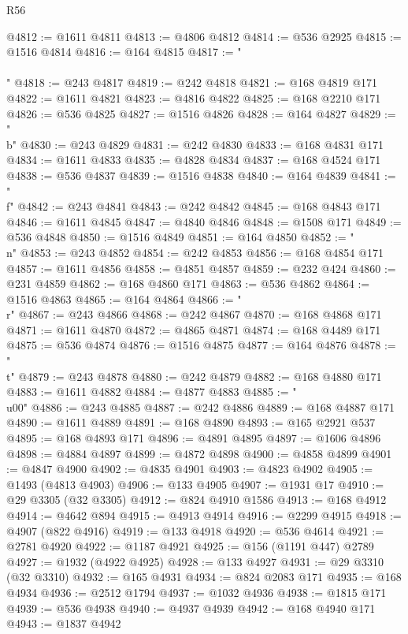 \begin{lexlean}{R56}
\begin{coremodule}
@4812 := @1611 @4811
@4813 := @4806 @4812
@4814 := @536 @2925
@4815 := @1516 @4814
@4816 := @164 @4815
@4817 := "\\\\"
@4818 := @243 @4817
@4819 := @242 @4818
@4821 := @168 @4819 @171
@4822 := @1611 @4821
@4823 := @4816 @4822
@4825 := @168 @2210 @171
@4826 := @536 @4825
@4827 := @1516 @4826
@4828 := @164 @4827
@4829 := "\\b"
@4830 := @243 @4829
@4831 := @242 @4830
@4833 := @168 @4831 @171
@4834 := @1611 @4833
@4835 := @4828 @4834
@4837 := @168 @4524 @171
@4838 := @536 @4837
@4839 := @1516 @4838
@4840 := @164 @4839
@4841 := "\\f"
@4842 := @243 @4841
@4843 := @242 @4842
@4845 := @168 @4843 @171
@4846 := @1611 @4845
@4847 := @4840 @4846
@4848 := @1508 @171
@4849 := @536 @4848
@4850 := @1516 @4849
@4851 := @164 @4850
@4852 := "\\n"
@4853 := @243 @4852
@4854 := @242 @4853
@4856 := @168 @4854 @171
@4857 := @1611 @4856
@4858 := @4851 @4857
@4859 := @232 @424
@4860 := @231 @4859
@4862 := @168 @4860 @171
@4863 := @536 @4862
@4864 := @1516 @4863
@4865 := @164 @4864
@4866 := "\\r"
@4867 := @243 @4866
@4868 := @242 @4867
@4870 := @168 @4868 @171
@4871 := @1611 @4870
@4872 := @4865 @4871
@4874 := @168 @4489 @171
@4875 := @536 @4874
@4876 := @1516 @4875
@4877 := @164 @4876
@4878 := "\\t"
@4879 := @243 @4878
@4880 := @242 @4879
@4882 := @168 @4880 @171
@4883 := @1611 @4882
@4884 := @4877 @4883
@4885 := "\\u00"
@4886 := @243 @4885
@4887 := @242 @4886
@4889 := @168 @4887 @171
@4890 := @1611 @4889
@4891 := @168 @4890
@4893 := @165 @2921 @537
@4895 := @168 @4893 @171
@4896 := @4891 @4895
@4897 := @1606 @4896
@4898 := @4884 @4897
@4899 := @4872 @4898
@4900 := @4858 @4899
@4901 := @4847 @4900
@4902 := @4835 @4901
@4903 := @4823 @4902
@4905 := @1493 (@4813 @4903)
@4906 := @133 @4905
@4907 := @1931 @17
@4910 := @29 @3305 (@32 @3305)
@4912 := @824 @4910 @1586
@4913 := @168 @4912
@4914 := @4642 @894
@4915 := @4913 @4914
@4916 := @2299 @4915
@4918 := @4907 (@822 @4916)
@4919 := @133 @4918
@4920 := @536 @4614
@4921 := @2781 @4920
@4922 := @1187 @4921
@4925 := @156 (@1191 @447) @2789
@4927 := @1932 (@4922 @4925)
@4928 := @133 @4927
@4931 := @29 @3310 (@32 @3310)
@4932 := @165 @4931
@4934 := @824 @2083 @171
@4935 := @168 @4934
@4936 := @2512 @1794
@4937 := @1032 @4936
@4938 := @1815 @171
@4939 := @536 @4938
@4940 := @4937 @4939
@4942 := @168 @4940 @171
@4943 := @1837 @4942

\end{coremodule}
\end{lexlean}
